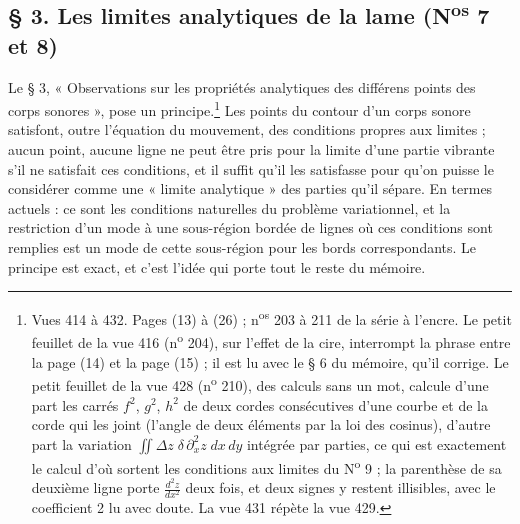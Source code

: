 \documentclass[11pt,a4paper]{article}
\begin{document}
\subsection*{§ 3. Les limites analytiques de la lame (N\textsuperscript{os} 7 et 8)}

Le § 3, « Observations sur les propriétés analytiques des différens points des corps
sonores », pose un principe.\footnote{Vues 414 à 432. Pages (13) à (26) ;
n\textsuperscript{os} 203 à 211 de la série à l'encre. Le petit feuillet de la vue
416 (n\textsuperscript{o} 204), sur l'effet de la cire, interrompt la phrase entre la
page (14) et la page (15) ; il est lu avec le § 6 du mémoire, qu'il corrige. Le petit feuillet
de la vue 428 (n\textsuperscript{o} 210), des calculs sans un mot, calcule d'une part
les carrés $f^2$, $g^2$, $h^2$ de deux cordes consécutives d'une courbe et de la corde
qui les joint (l'angle de deux éléments par la loi des cosinus), d'autre part la
variation $\iint \Delta z\;\delta\,\partial_x^2 z\;dx\,dy$ intégrée par parties, ce qui
est exactement le calcul d'où sortent les conditions aux limites du N\textsuperscript{o}
9 ; la parenthèse de sa deuxième ligne porte $\frac{d^2z}{dx^2}$ deux fois, et deux
signes y restent illisibles, avec le coefficient 2 lu avec doute. La vue 431 répète la
vue 429.} Les points du contour d'un corps sonore satisfont, outre l'équation du
mouvement, des conditions propres aux limites ; aucun point, aucune ligne ne peut
être pris pour la limite d'une partie vibrante s'il ne satisfait ces conditions, et il
suffit qu'il les satisfasse pour qu'on puisse le considérer comme une « limite
analytique » des parties qu'il sépare. En termes actuels : ce sont les conditions
naturelles du problème variationnel, et la restriction d'un mode à une sous-région
bordée de lignes où ces conditions sont remplies est un mode de cette sous-région pour
les bords correspondants. Le principe est exact, et c'est l'idée qui porte tout le
reste du mémoire.
\end{document}
